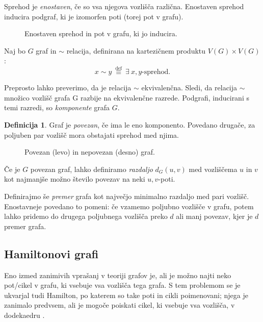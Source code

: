 \documentclass[12pt,a4paper]{amsart}
\theoremstyle{definition} %
\newtheorem{definicija}{Definicija}[section]
\theoremstyle{plain} %
\newcommand{\vozlisca}[1][G]{\ensuremath{V(#1)}}
\begin{document}
Sprehod je \emph{enostaven}, če so vsa njegova vozlišča različna. Enostaven sprehod inducira podgraf, ki je izomorfen poti (torej pot v grafu).

\begin{figure}[h]
    \caption{Enostaven sprehod in pot v grafu, ki jo inducira.}
\end{figure}

Naj bo $G$ graf in $\sim$ relacija, definirana na kartezičnem produktu $\vozlisca \times \vozlisca$:
\[ x \sim y \ \stackrel{\text{def}}{\equiv} \ \exists \ x,y \text{-sprehod.} \]

Preprosto lahko preverimo, da je relacija $\sim$ ekvivalenčna. Sledi, da relacija $\sim$ množico vozlišč grafa G razbije na ekvivalenčne razrede. Podgrafi, inducirani s temi razredi, so \emph{komponente} grafa $G$.

\begin{definicija}
	Graf je \emph{povezan}, če ima le eno komponento. Povedano drugače, za poljuben par vozlišč mora obstajati sprehod med njima.
\end{definicija}

\begin{figure}[h]
    \caption{Povezan (levo) in nepovezan (desno) graf.}
\end{figure}

Če je $G$ povezan graf, lahko definiramo \emph{razdaljo} $d_G(u,v)$ med vozliščema $u$ in $v$ kot najmanjše možno število povezav na neki $u,v$-poti.

Definirajmo še \emph{premer} grafa kot največjo minimalno razdaljo med pari vozlišč. Enostavneje povedano to pomeni: če vzamemo poljubno vozlišče v grafu, potem lahko pridemo do drugega poljubnega vozlišča preko $d$ ali manj povezav, kjer je $d$ premer grafa.

\subsection{Hamiltonovi grafi}

Eno izmed zanimivih vprašanj v teoriji grafov je, ali je možno najti neko pot/cikel v grafu, ki vsebuje vsa vozlišča tega grafa. S tem problemom se je ukvarjal tudi Hamilton, po katerem so take poti in cikli poimenovani; njega je zanimalo predvsem, ali je mogoče poiskati cikel, ki vsebuje vsa vozlišča, v dodekaedru \cite{bib:wikihamilpath}.
\end{document}
